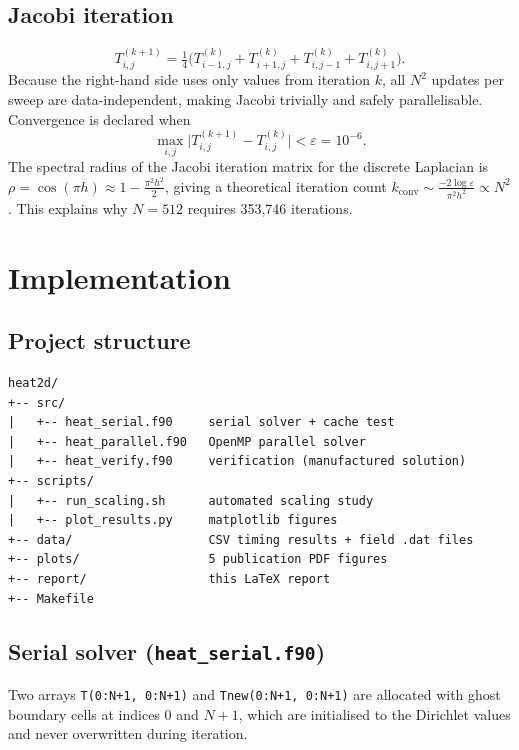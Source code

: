 \documentclass[12pt,a4paper]{article}
\begin{document}
\subsection{Jacobi iteration}
\begin{equation}
  T_{i,j}^{(k+1)}=\tfrac{1}{4}\bigl(T_{i-1,j}^{(k)}+T_{i+1,j}^{(k)}
  +T_{i,j-1}^{(k)}+T_{i,j+1}^{(k)}\bigr).
  \label{eq:jacobi}
\end{equation}
Because the right-hand side uses only values from iteration $k$, all $N^2$
updates per sweep are data-independent, making Jacobi trivially and safely
parallelisable. Convergence is declared when
\begin{equation}
  \max_{i,j}\bigl|T_{i,j}^{(k+1)}-T_{i,j}^{(k)}\bigr|<\varepsilon
  =10^{-6}.
\end{equation}
The spectral radius of the Jacobi iteration matrix for the discrete Laplacian
is $\rho=\cos(\pi h)\approx1-\tfrac{\pi^2 h^2}{2}$, giving a theoretical
iteration count $k_{\text{conv}}\sim\tfrac{-2\log\varepsilon}{\pi^2h^2}
\propto N^2$. This explains why $N=512$ requires 353,746 iterations.

\section{Implementation}

\subsection{Project structure}
\begin{verbatim}
heat2d/
+-- src/
|   +-- heat_serial.f90     serial solver + cache test
|   +-- heat_parallel.f90   OpenMP parallel solver
|   +-- heat_verify.f90     verification (manufactured solution)
+-- scripts/
|   +-- run_scaling.sh      automated scaling study
|   +-- plot_results.py     matplotlib figures
+-- data/                   CSV timing results + field .dat files
+-- plots/                  5 publication PDF figures
+-- report/                 this LaTeX report
+-- Makefile
\end{verbatim}

\subsection{Serial solver (\texttt{heat\_serial.f90})}

Two arrays \texttt{T(0:N+1,~0:N+1)} and \texttt{Tnew(0:N+1,~0:N+1)} are
allocated with ghost boundary cells at indices 0 and $N+1$, which are
initialised to the Dirichlet values and never overwritten during iteration.
\end{document}
